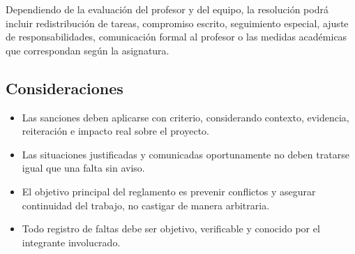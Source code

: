 \documentclass[12pt,a4paper]{article}
\begin{document}
Dependiendo de la evaluación del profesor y del equipo, la resolución podrá incluir redistribución de tareas, compromiso escrito, seguimiento especial, ajuste de responsabilidades, comunicación formal al profesor o las medidas académicas que correspondan según la asignatura.

\subsection{Consideraciones}

\begin{itemize}
    \item Las sanciones deben aplicarse con criterio, considerando contexto, evidencia, reiteración e impacto real sobre el proyecto.
    \item Las situaciones justificadas y comunicadas oportunamente no deben tratarse igual que una falta sin aviso.
    \item El objetivo principal del reglamento es prevenir conflictos y asegurar continuidad del trabajo, no castigar de manera arbitraria.
    \item Todo registro de faltas debe ser objetivo, verificable y conocido por el integrante involucrado.
\end{itemize}
\end{document}
